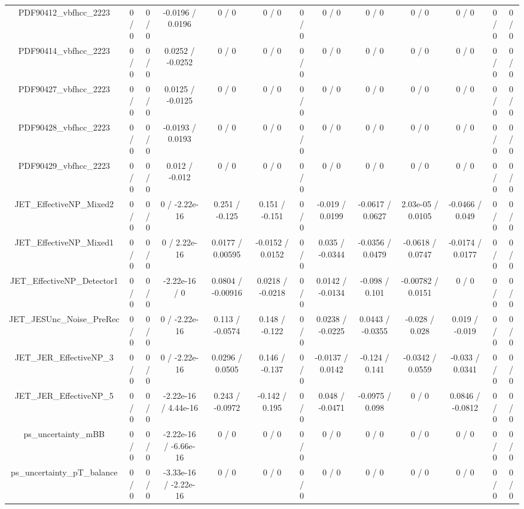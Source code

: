 \documentclass[10pt]{article}
\begin{document}
\begin{table}[htbp]
\begin{center}
\begin{tabular}{|c|c|c|c|c|c|c|c|c|c|c|c|c|}
  PDF90412_vbfhcc_2223 & 0 / 0 & 0 / 0 & -0.0196 / 0.0196 & 0 / 0 & 0 / 0 & 0 / 0 & 0 / 0 & 0 / 0 & 0 / 0 & 0 / 0 & 0 / 0 & 0 / 0 \\ 
  PDF90414_vbfhcc_2223 & 0 / 0 & 0 / 0 & 0.0252 / -0.0252 & 0 / 0 & 0 / 0 & 0 / 0 & 0 / 0 & 0 / 0 & 0 / 0 & 0 / 0 & 0 / 0 & 0 / 0 \\ 
  PDF90427_vbfhcc_2223 & 0 / 0 & 0 / 0 & 0.0125 / -0.0125 & 0 / 0 & 0 / 0 & 0 / 0 & 0 / 0 & 0 / 0 & 0 / 0 & 0 / 0 & 0 / 0 & 0 / 0 \\ 
  PDF90428_vbfhcc_2223 & 0 / 0 & 0 / 0 & -0.0193 / 0.0193 & 0 / 0 & 0 / 0 & 0 / 0 & 0 / 0 & 0 / 0 & 0 / 0 & 0 / 0 & 0 / 0 & 0 / 0 \\ 
  PDF90429_vbfhcc_2223 & 0 / 0 & 0 / 0 & 0.012 / -0.012 & 0 / 0 & 0 / 0 & 0 / 0 & 0 / 0 & 0 / 0 & 0 / 0 & 0 / 0 & 0 / 0 & 0 / 0 \\ 
  JET_EffectiveNP_Mixed2 & 0 / 0 & 0 / 0 & 0 / -2.22e-16 & 0.251 / -0.125 & 0.151 / -0.151 & 0 / 0 & -0.019 / 0.0199 & -0.0617 / 0.0627 & 2.03e-05 / 0.0105 & -0.0466 / 0.049 & 0 / 0 & 0 / 0 \\ 
  JET_EffectiveNP_Mixed1 & 0 / 0 & 0 / 0 & 0 / 2.22e-16 & 0.0177 / 0.00595 & -0.0152 / 0.0152 & 0 / 0 & 0.035 / -0.0344 & -0.0356 / 0.0479 & -0.0618 / 0.0747 & -0.0174 / 0.0177 & 0 / 0 & 0 / 0 \\ 
  JET_EffectiveNP_Detector1 & 0 / 0 & 0 / 0 & -2.22e-16 / 0 & 0.0804 / -0.00916 & 0.0218 / -0.0218 & 0 / 0 & 0.0142 / -0.0134 & -0.098 / 0.101 & -0.00782 / 0.0151 & 0 / 0 & 0 / 0 & 0 / 0 \\ 
  JET_JESUnc_Noise_PreRec & 0 / 0 & 0 / 0 & 0 / -2.22e-16 & 0.113 / -0.0574 & 0.148 / -0.122 & 0 / 0 & 0.0238 / -0.0225 & 0.0443 / -0.0355 & -0.028 / 0.028 & 0.019 / -0.019 & 0 / 0 & 0 / 0 \\ 
  JET_JER_EffectiveNP_3 & 0 / 0 & 0 / 0 & 0 / -2.22e-16 & 0.0296 / 0.0505 & 0.146 / -0.137 & 0 / 0 & -0.0137 / 0.0142 & -0.124 / 0.141 & -0.0342 / 0.0559 & -0.033 / 0.0341 & 0 / 0 & 0 / 0 \\ 
  JET_JER_EffectiveNP_5 & 0 / 0 & 0 / 0 & -2.22e-16 / 4.44e-16 & 0.243 / -0.0972 & -0.142 / 0.195 & 0 / 0 & 0.048 / -0.0471 & -0.0975 / 0.098 & 0 / 0 & 0.0846 / -0.0812 & 0 / 0 & 0 / 0 \\ 
  ps_uncertainty_mBB & 0 / 0 & 0 / 0 & -2.22e-16 / -6.66e-16 & 0 / 0 & 0 / 0 & 0 / 0 & 0 / 0 & 0 / 0 & 0 / 0 & 0 / 0 & 0 / 0 & 0 / 0 \\ 
  ps_uncertainty_pT_balance & 0 / 0 & 0 / 0 & -3.33e-16 / -2.22e-16 & 0 / 0 & 0 / 0 & 0 / 0 & 0 / 0 & 0 / 0 & 0 / 0 & 0 / 0 & 0 / 0 & 0 / 0 \\ 

\end{tabular}
\end{center}
\end{table}
\end{document}
